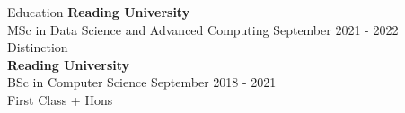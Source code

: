 \begin{rSection}{Education}
{\bf Reading University} \\ 
{MSc in Data Science and Advanced Computing} \hfill
{September 2021 - 2022} \\\hfill 
{Distinction}
\vspace{0.25cm}\\
{\bf Reading University} \\ 
{BSc in Computer Science} \hfill
{September 2018 - 2021} \\\hfill 
{First Class + Hons}
\end{rSection}